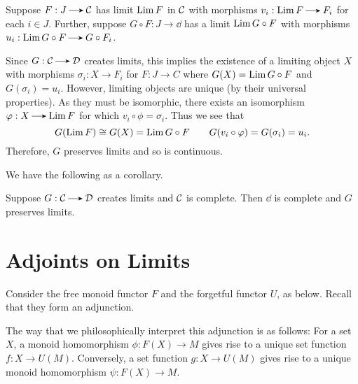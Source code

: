     \begin{prf}
        Suppose $F: J \to \cc$ has limit $\operatorname*{\mathrm{Lim }} F$ in $\mathcal{C}$ with morphisms 
        $v_i: \Lim F \to F_i$ for each $i \in J$. 
        Further, suppose $G \circ F: J \to \dd$ has a limit 
        $\operatorname*{\mathrm{Lim }} G \circ F$ with morphisms $u_i: \Lim G \circ F
        \to G\circ F_i$. 

        Since $G: \cc \to \dd$ creates limits, this implies 
        the existence of a limiting object $X$ with morphisms 
        $\sigma_i: X \to F_i$ for $F: J \to C$ 
        where $G(X) = \operatorname*{\mathrm{Lim }} G\circ F$ and $G(\sigma_i) = u_i$. 
        However, limiting objects are unique (by their universal properties).  
        As they must be isomorphic, there exists an isomorphism 
        $\phi: X \to \Lim F$ for which $v_i \circ \phi= \sigma_i$. 
        Thus we see that 
        \[
            G(\operatorname*{\mathrm{Lim }} F) \cong G(X) = \operatorname*{\mathrm{Lim }} G \circ F \qquad 
            G(v_i \circ \varphi) = G(\sigma_i) = u_i.
        \]
        Therefore, $G$ preserves limits and so is continuous. 
    \end{prf}

    We have the following as a corollary. 

    \begin{corollary}
        Suppose $G: \cc \to \dd$ creates limits and $\mathcal{C}$ is complete. 
        Then $\dd$ is complete and $G$ preserves limits. 
    \end{corollary}

    

    \newpage
    \section{Adjoints on Limits}

    Consider the free monoid functor $F$ and the 
    forgetful functor $U$, as below. Recall that they form an adjunction.
    \begin{center}
    \end{center}
    The way that we philosophically 
    interpret this adjunction is as follows: For a set $X$, a monoid homomorphism
    $\phi: F(X) \to M$ gives rise to a unique set function 
    $f: X \to U(M)$. Conversely, a set function $g: X \to U(M)$ 
    gives rise to a unique monoid homomorphism $\psi: F(X) \to M$. 

